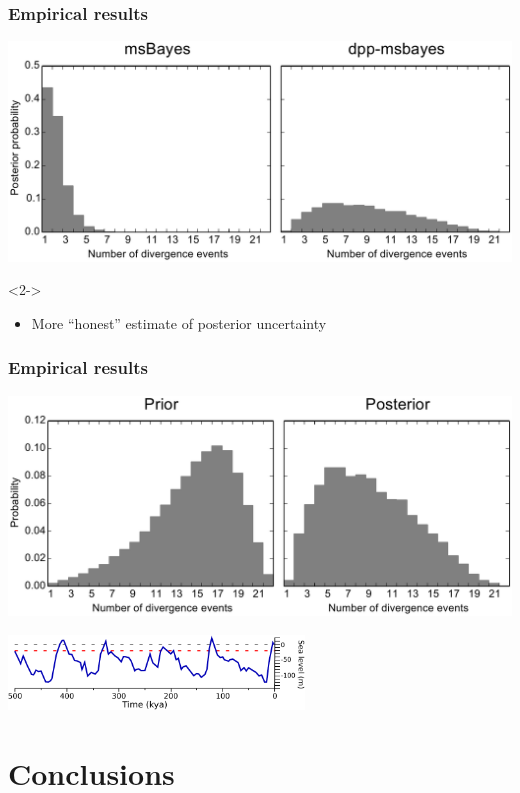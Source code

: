 \begin{frame}
    \frametitle{Empirical results}
    \centerline{
    \includegraphics[width=\textwidth]{../../empirical-analyses/plots/philippines-dpp-psi-posterior-old-vs-dpp.pdf}}

    \begin{uncoverenv}<2->
    \begin{itemize}
        \item More ``honest'' estimate of posterior uncertainty
    \end{itemize}
    \end{uncoverenv}
\end{frame}

\begin{frame}
    \frametitle{Empirical results}
    \centerline{
    \includegraphics[width=\textwidth]{../../empirical-analyses/plots/philippines-dpp-psi-posterior-prior.pdf}}
    \smallskip
    \centerline{
    \includegraphics[height=2cm]{../images/sea-level-only.pdf}}
\end{frame}

\section{Conclusions}

